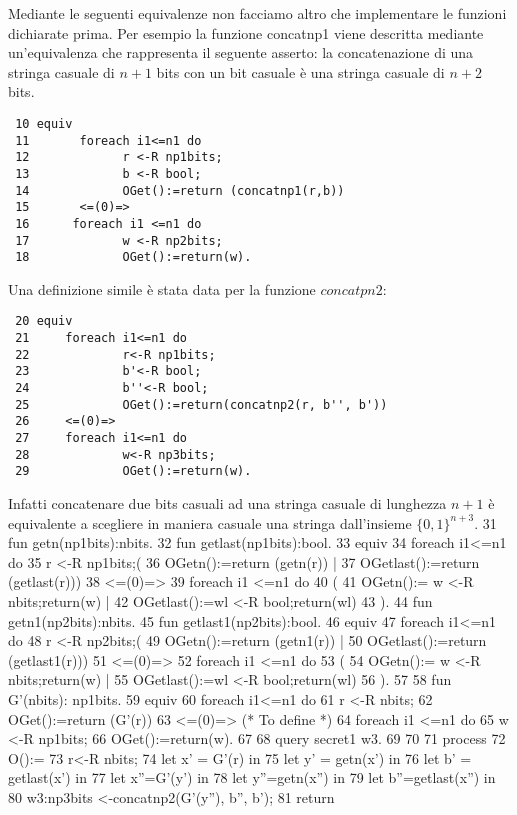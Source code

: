 \documentclass[a4paper,openright,twoside,12pt]{report}
\begin{document}
Mediante le seguenti equivalenze non facciamo altro che implementare le funzioni dichiarate prima.
Per esempio la funzione concatnp1 viene descritta mediante un'equivalenza che rappresenta il seguente asserto:
la concatenazione di una stringa casuale di $n+1$ bits con un bit casuale \`e una stringa casuale di
$n+2$ bits. 
\begin{verbatim}
 10 equiv
 11       foreach i1<=n1 do
 12             r <-R np1bits;
 13             b <-R bool;
 14             OGet():=return (concatnp1(r,b))
 15       <=(0)=>
 16      foreach i1 <=n1 do
 17             w <-R np2bits;
 18             OGet():=return(w).
\end{verbatim} 
Una definizione simile \`e stata data per la funzione $concatpn2$:
\begin{verbatim}
 20 equiv
 21     foreach i1<=n1 do
 22             r<-R np1bits;
 23             b'<-R bool;
 24             b''<-R bool;
 25             OGet():=return(concatnp2(r, b'', b'))
 26     <=(0)=>
 27     foreach i1<=n1 do
 28             w<-R np3bits;
 29             OGet():=return(w).
\end{verbatim}
Infatti concatenare due bits casuali ad una stringa casuale di lunghezza $n+1$ \`e equivalente a scegliere in maniera casuale una stringa
dall'insieme $\{0, 1\}^{n+3}$.
 31 fun getn(np1bits):nbits.
 32 fun getlast(np1bits):bool.
 33 equiv
 34        foreach i1<=n1 do
 35              r <-R np1bits;(
 36              OGetn():=return (getn(r)) |
 37              OGetlast():=return (getlast(r)))
 38        <=(0)=>
 39       foreach i1 <=n1 do
 40               (
 41               OGetn():= w <-R nbits;return(w) |
 42               OGetlast():=wl <-R bool;return(wl)
 43               ).
 44 fun getn1(np2bits):nbits.
 45 fun getlast1(np2bits):bool.
 46 equiv
 47       foreach i1<=n1 do
 48             r <-R np2bits;(
 49             OGetn():=return (getn1(r)) |
 50             OGetlast():=return (getlast1(r)))
 51       <=(0)=>
 52      foreach i1 <=n1 do
 53              (
 54              OGetn():= w <-R nbits;return(w) |
 55              OGetlast():=wl <-R bool;return(wl)
 56              ).
 57 
 58 fun G'(nbits): np1bits.
 59 equiv
 60     foreach i1<=n1 do
 61                 r <-R nbits;
 62                 OGet():=return (G'(r))
 63       <=(0)=> (* To define *)
 64      foreach i1 <=n1 do
 65                 w <-R np1bits;
 66                 OGet():=return(w).
 67 
 68 query secret1 w3.
 69 
 70 
 71 process
 72         O():=
 73              r<-R nbits;
 74              let x' = G'(r) in
 75              let y' = getn(x') in
 76              let b' = getlast(x') in
 77              let x''=G'(y') in
 78              let y''=getn(x'') in
 79          	 let b''=getlast(x'') in
 80              w3:np3bits <-concatnp2(G'(y''), b'', b');
 81 		 return
\end{document}
